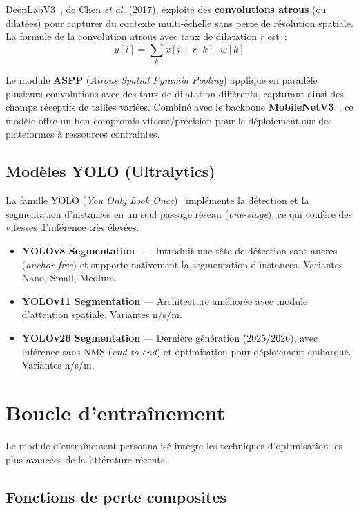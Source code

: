 \documentclass[12pt,a4paper]{report}
\begin{document}
DeepLabV3~\cite{chen2017deeplabv3}, de Chen \textit{et al.} (2017), exploite des \textbf{convolutions atrous} (ou dilat\'ees) pour capturer du contexte multi-\'echelle sans perte de r\'esolution spatiale. La formule de la convolution atrous avec taux de dilatation $r$ est~:
\[
    y[i] = \sum_k x[i + r \cdot k] \cdot w[k]
\]

Le module \textbf{ASPP} (\textit{Atrous Spatial Pyramid Pooling}) applique en parall\`ele plusieurs convolutions avec des taux de dilatation diff\'erents, capturant ainsi des champs r\'eceptifs de tailles vari\'ees. Combin\'e avec le backbone \textbf{MobileNetV3}~\cite{howard2019mobilenetv3}, ce mod\`ele offre un bon compromis vitesse/pr\'ecision pour le d\'eploiement sur des plateformes \`a ressources contraintes.

\subsection{Mod\`eles YOLO (Ultralytics)}

La famille YOLO (\textit{You Only Look Once})~\cite{jocher2023yolov8} impl\'emente la d\'etection et la segmentation d'instances en un seul passage r\'eseau (\textit{one-stage}), ce qui conf\`ere des vitesses d'inf\'erence tr\`es \'elev\'ees.

\begin{itemize}
    \item \textbf{YOLOv8 Segmentation}~\cite{jocher2023yolov8} --- Introduit une t\^ete de d\'etection sans ancres (\textit{anchor-free}) et supporte nativement la segmentation d'instances. Variantes Nano, Small, Medium.
    \item \textbf{YOLOv11 Segmentation} --- Architecture am\'elior\'ee avec module d'attention spatiale. Variantes n/s/m.
    \item \textbf{YOLOv26 Segmentation} --- Derni\`ere g\'en\'eration (2025/2026), avec inf\'erence sans NMS (\textit{end-to-end}) et optimisation pour d\'eploiement embarqu\'e. Variantes n/s/m.
\end{itemize}

\section{Boucle d'entra\^inement}

Le module d'entra\^inement personnalis\'e int\`egre les techniques d'optimisation les plus avanc\'ees de la litt\'erature r\'ecente.

\subsection{Fonctions de perte composites}
\end{document}
